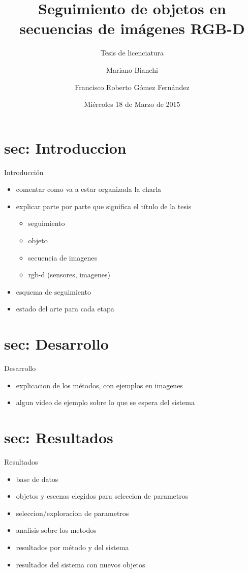 \documentclass[]{beamer}
\title{Seguimiento de objetos en secuencias de imágenes RGB-D}
\subtitle{Tesis de licenciatura}
\institute{Facultad de Ciencias Exactas y Naturales}
\date[18/03/15]{Miércoles 18 de Marzo de 2015}
\author[Mariano Bianchi]{Mariano Bianchi \and Francisco Roberto Gómez Fernández}
\begin{document}
\maketitle


\section{sec: Introduccion}
\begin{frame}{Introducción} %
    \begin{itemize}
        \item comentar como va a estar organizada la charla
        \item explicar parte por parte que significa el título de la tesis
        \begin{itemize}
            \item seguimiento
            \item objeto
            \item secuencia de imagenes
            \item rgb-d (sensores, imagenes)
        \end{itemize}
        \item esquema de seguimiento
        \item estado del arte para cada etapa
    \end{itemize}
\end{frame}


\section{sec: Desarrollo}
\begin{frame}{Desarrollo}
    \begin{itemize}
        \item explicacion de los métodos, con ejemplos en imagenes
        \item algun video de ejemplo sobre lo que se espera del sistema
    \end{itemize}

\end{frame}


\section{sec: Resultados}
\begin{frame}{Resultados}
    \begin{itemize}
        \item base de datos
        \item objetos y escenas elegidos para seleccion de parametros
        \item seleccion/exploracion de parametros
        \item analisis sobre los metodos
        \item resultados por método y del sistema
        \item resultados del sistema con nuevos objetos
    \end{itemize}
\end{frame}
\end{document}
